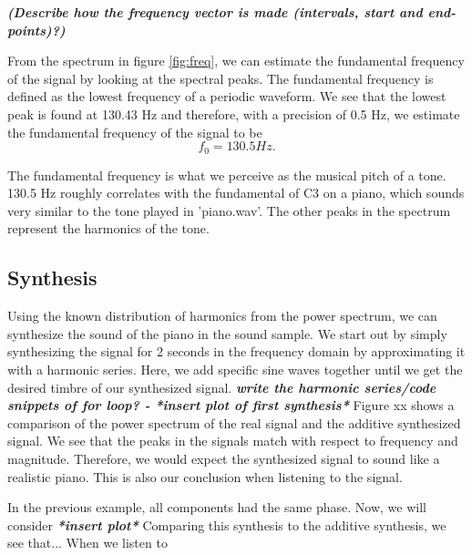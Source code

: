 \documentclass[journal]{IEEEtran}
\begin{document}
\textbf{\textit{(Describe how the frequency vector is made (intervals, start and end-points)?)}}

\newline
From the spectrum in figure \ref{fig:freq}, we can estimate the fundamental frequency of the signal by looking at the spectral peaks. The fundamental frequency is defined as the lowest frequency of a periodic waveform. %
We see that the lowest peak is found at 130.43 Hz and therefore, with a precision of 0.5 Hz, we estimate the fundamental frequency of the signal to be
\begin{equation}
    f_0 = 130.5 Hz.
\end{equation}

The fundamental frequency is what we perceive as the musical pitch of a tone. 130.5 Hz roughly correlates with the fundamental of C3 on a piano, which sounds very similar to the tone played in 'piano.wav'. The other peaks in the spectrum represent the harmonics of the tone. 

\subsection{Synthesis}
Using the known distribution of harmonics from the power spectrum, we can synthesize the sound of the piano in the sound sample. We start out by simply synthesizing the signal for 2 seconds in the frequency domain by approximating it with a harmonic series. Here, we add specific sine waves together until we get the desired timbre of our synthesized signal. 
\newline
\textbf{\textit{write the harmonic series/code snippets of for loop? - *insert plot of first synthesis*}}
\newline
Figure xx shows a comparison of the power spectrum of the real signal and the additive synthesized signal. We see that the peaks in the signals match with respect to frequency and magnitude. Therefore, we would expect the synthesized signal to sound like a realistic piano. This is also our conclusion when listening to the signal.


\newline
In the previous example, all components had the same phase. Now, we will consider 
\newline
\textit{\textbf{*insert plot*}}
\newline
Comparing this synthesis to the additive synthesis, we see that...
When we listen to 

\end{document}

